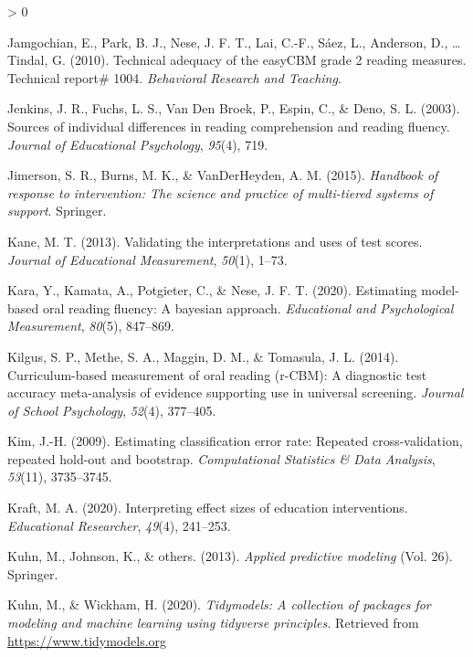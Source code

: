 \documentclass[
  english,
  man, fleqn, noextraspace]{apa6}
\newlength{\cslhangindent}
\newenvironment{CSLReferences}[2] %
 {%
  \setlength{\parindent}{0pt}
  \ifodd #1 \everypar{\setlength{\hangindent}{\cslhangindent}}\ignorespaces\fi
  \ifnum #2 > 0
  \setlength{\parskip}{#2\baselineskip}
  \fi
 }%
 {}
\begin{document}
\begin{CSLReferences}{1}{0}
\leavevmode\hypertarget{ref-jamgochian2010tech}{}%
Jamgochian, E., Park, B. J., Nese, J. F. T., Lai, C.-F., Sáez, L., Anderson, D., \ldots{} Tindal, G. (2010). Technical adequacy of the easyCBM grade 2 reading measures. Technical report\# 1004. \emph{Behavioral Research and Teaching}.

\leavevmode\hypertarget{ref-jenkins2003}{}%
Jenkins, J. R., Fuchs, L. S., Van Den Broek, P., Espin, C., \& Deno, S. L. (2003). Sources of individual differences in reading comprehension and reading fluency. \emph{Journal of Educational Psychology}, \emph{95}(4), 719.

\leavevmode\hypertarget{ref-jimerson2015}{}%
Jimerson, S. R., Burns, M. K., \& VanDerHeyden, A. M. (2015). \emph{Handbook of response to intervention: The science and practice of multi-tiered systems of support}. Springer.

\leavevmode\hypertarget{ref-kane2013}{}%
Kane, M. T. (2013). Validating the interpretations and uses of test scores. \emph{Journal of Educational Measurement}, \emph{50}(1), 1--73.

\leavevmode\hypertarget{ref-kara2020}{}%
Kara, Y., Kamata, A., Potgieter, C., \& Nese, J. F. T. (2020). Estimating model-based oral reading fluency: A bayesian approach. \emph{Educational and Psychological Measurement}, \emph{80}(5), 847--869.

\leavevmode\hypertarget{ref-kilgus2014}{}%
Kilgus, S. P., Methe, S. A., Maggin, D. M., \& Tomasula, J. L. (2014). Curriculum-based measurement of oral reading (r-CBM): A diagnostic test accuracy meta-analysis of evidence supporting use in universal screening. \emph{Journal of School Psychology}, \emph{52}(4), 377--405.

\leavevmode\hypertarget{ref-kim2009}{}%
Kim, J.-H. (2009). Estimating classification error rate: Repeated cross-validation, repeated hold-out and bootstrap. \emph{Computational Statistics \& Data Analysis}, \emph{53}(11), 3735--3745.

\leavevmode\hypertarget{ref-kraft2020}{}%
Kraft, M. A. (2020). Interpreting effect sizes of education interventions. \emph{Educational Researcher}, \emph{49}(4), 241--253.

\leavevmode\hypertarget{ref-kuhn2013}{}%
Kuhn, M., Johnson, K., \& others. (2013). \emph{Applied predictive modeling} (Vol. 26). Springer.

\leavevmode\hypertarget{ref-R-tidymodels}{}%
Kuhn, M., \& Wickham, H. (2020). \emph{Tidymodels: A collection of packages for modeling and machine learning using tidyverse principles.} Retrieved from \url{https://www.tidymodels.org}


\end{CSLReferences}
\end{document}

